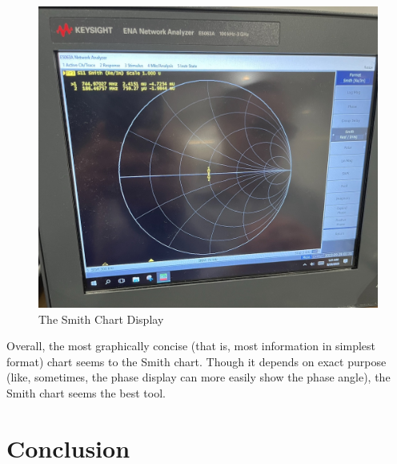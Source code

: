 \documentclass[
	letterpaper, %
	10pt, %
]{CSUniSchoolLabReport}
\begin{document}
  \begin{figure}[H]
    \centering
    \includegraphics[width=.75\textwidth]{Figures/Lab One/Smith.png}
    \caption{The Smith Chart Display}
    \label{fig:13}
  \end{figure}

  Overall, the most graphically concise (that is, most information in simplest format) chart seems to the Smith chart. Though it depends on exact purpose (like, sometimes, the phase display can more easily show the phase angle), the Smith chart seems the best tool.

\section{Conclusion}
\end{document}
